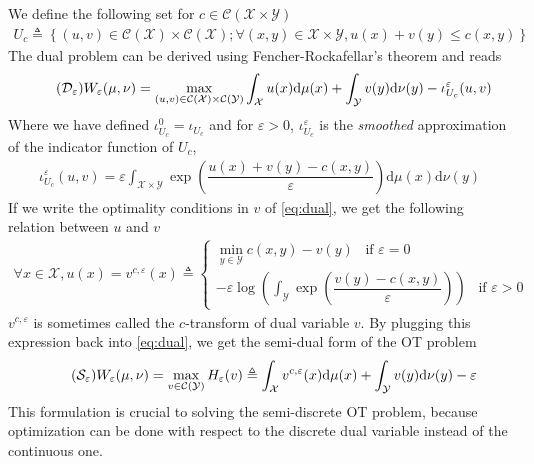 We define the following set for $c\in \mathcal{C}(\mathcal{X}\times \mathcal{Y})$
\begin{align*}
    U_c \triangleq \left\{ (u, v) \in \mathcal{C}(\mathcal{X})\times \mathcal{C}(\mathcal{X}) ; \forall (x, y) \in \mathcal{X}\times\mathcal{Y}, u(x)+v(y) \leq c(x,y)\right\}
\end{align*}
The dual problem can be derived using Fencher-Rockafellar's theorem \cite{genevay_stochastic_2016} and reads
\begin{align*} 
    \label{eq:dual}
    \tag{$\mathcal{D_\varepsilon}$}
    W_\varepsilon(\mu, \nu) = \max_{(u, v)\in \mathcal{C}(\mathcal{X})\times\mathcal{C}(\mathcal{Y})} \int_\mathcal{X} u(x)\text{d}\mu(x) + \int_\mathcal{Y}v(y)\text{d}\nu(y) - \iota_{U_c}^\varepsilon(u, v)
\end{align*}
Where we have defined $\iota_{U_c}^0 = \iota_{U_c}$ and for $\varepsilon>0$, $\iota_{U_c}^\varepsilon$ is the \emph{smoothed} approximation of the indicator function of $U_c$,
\begin{align*}
    \iota_{U_c}^\varepsilon(u, v) = \varepsilon \int_{\mathcal{X}\times\mathcal{Y}} \exp\left(\dfrac{u(x)+v(y) - c(x, y)}{\varepsilon}\right)\text{d}\mu(x)\text{d}\nu(y)
\end{align*}
If we write the optimality conditions in $v$ of \eqref{eq:dual}, we get the following relation between $u$ and $v$
\begin{align*}
    \forall x \in \mathcal{X}, u(x) = v^{c, \varepsilon}(x) \triangleq \begin{cases}
        \min_{y\in \mathcal{Y}} c(x, y) - v(y) \hspace{10pt} \text{if } \varepsilon = 0\\
        -\varepsilon\log\left( \int_\mathcal{Y}\exp\left( \dfrac{v(y) - c(x, y)}{\varepsilon}\right) \right) \hspace{10pt} \text{if } \varepsilon > 0
    \end{cases}
\end{align*}
$v^{c, \varepsilon}$ is sometimes called the $c$-transform \cite{smooth_cuturi_peyre_2016} of dual variable $v$. By plugging this expression back into \eqref{eq:dual}, we get the semi-dual form of the OT problem
\begin{align*} 
    \label{eq:semi-dual}
    \tag{$\mathcal{S_\varepsilon}$}
    W_\varepsilon(\mu, \nu) = \max_{v\in\mathcal{C}(\mathcal{Y})} H_\varepsilon(v)\triangleq \int_\mathcal{X} v^{c,\varepsilon}(x)\text{d}\mu(x) + \int_\mathcal{Y}v(y)\text{d}\nu(y) - \varepsilon
\end{align*}
This formulation is crucial to solving the semi-discrete OT problem, because optimization can be done with respect to the discrete dual variable instead of the continuous one. 

